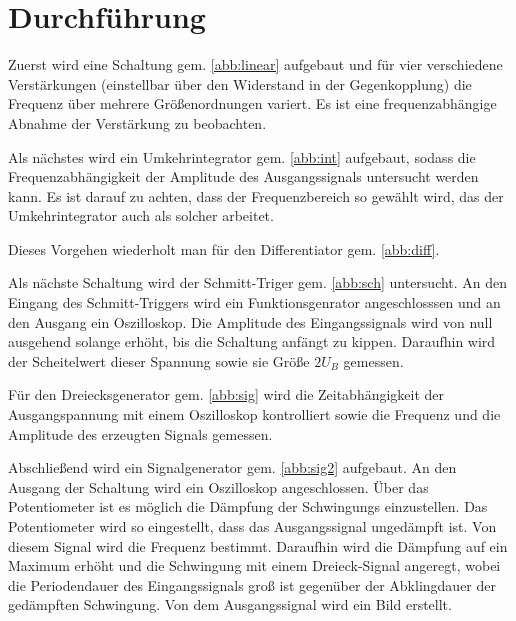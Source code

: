 \section{Durchf{\"u}hrung}
Zuerst wird eine Schaltung gem. \ref{abb:linear} aufgebaut und für vier verschiedene Verstärkungen (einstellbar über den Widerstand in der Gegenkopplung)
die Frequenz über mehrere Größenordnungen variert. Es ist eine frequenzabhängige Abnahme der Verstärkung zu beobachten.

Als nächstes wird ein Umkehrintegrator gem. \ref{abb:int} aufgebaut, sodass die
Frequenzabhängigkeit der Amplitude des Ausgangssignals untersucht werden kann. Es
ist darauf zu achten, dass der Frequenzbereich so gewählt wird, das der Umkehrintegrator
auch als solcher arbeitet.

\noindent Dieses Vorgehen wiederholt man für den Differentiator gem. \ref{abb:diff}.

Als nächste Schaltung wird der Schmitt-Triger gem. \ref{abb:sch} untersucht.
An den Eingang des Schmitt-Triggers wird ein Funktionsgenrator angeschlosssen und an den Ausgang
ein Oszilloskop. Die Amplitude des Eingangssignals wird von null ausgehend solange erhöht,
bis die Schaltung anfängt zu kippen. Daraufhin wird der Scheitelwert dieser Spannung sowie
sie Größe $2U_B$ gemessen.

Für den Dreiecksgenerator gem. \ref{abb:sig} wird die Zeitabhängigkeit der Ausgangspannung mit einem
Oszilloskop kontrolliert sowie die Frequenz und die Amplitude des erzeugten Signals gemessen.

Abschließend wird ein Signalgenerator gem. \ref{abb:sig2} aufgebaut. An den Ausgang der Schaltung
wird ein Oszilloskop angeschlossen. Über das Potentiometer ist es möglich die Dämpfung der Schwingungs
einzustellen. Das Potentiometer wird so eingestellt, dass das Ausgangssignal ungedämpft ist. Von diesem Signal wird
die Frequenz bestimmt. Daraufhin wird die Dämpfung auf ein Maximum erhöht und
die Schwingung mit einem Dreieck-Signal angeregt, wobei die Periodendauer des Eingangssignals groß ist
gegenüber der Abklingdauer der gedämpften Schwingung. Von dem Ausgangssignal wird ein Bild erstellt.
